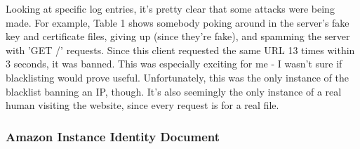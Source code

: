 \documentclass[12pt]{article}
\begin{document}
Looking at specific log entries, it's pretty clear that some attacks were being made.
For example, Table 1 shows somebody poking around in the server's fake key and certificate files, giving up (since they're fake), and spamming the server with 'GET /' requests.
Since this client requested the same URL 13 times within 3 seconds, it was banned.
This was especially exciting for me - I wasn't sure if blacklisting would prove useful.
Unfortunately, this was the only instance of the blacklist banning an IP, though.
It's also seemingly the only instance of a real human visiting the website, since every request is for a real file.

\clearpage
\subsubsection{Amazon Instance Identity Document}
\end{document}
